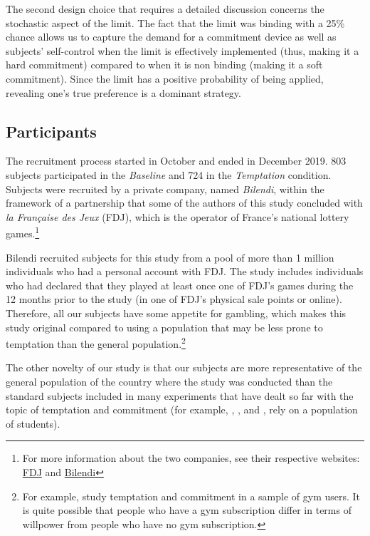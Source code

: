 \documentclass[
]{book}
\begin{document}
The second design choice that requires a detailed discussion concerns the stochastic aspect of the limit.
The fact that the limit was binding with a 25\% chance allows us to capture the demand for a commitment device as well as subjects' self-control when the limit is effectively implemented (thus, making it a hard commitment) compared to when it is non binding (making it a soft commitment).
Since the limit has a positive probability of being applied, revealing one's true preference is a dominant strategy.

\hypertarget{participants}{%
\subsection{Participants}\label{participants}}

The recruitment process started in October and ended in December 2019.
803 subjects participated in the \emph{Baseline} and 724 in the \emph{Temptation} condition.
Subjects were recruited by a private company, named \emph{Bilendi}, within the framework of a partnership that some of the authors of this study concluded with \emph{la Française des Jeux} (FDJ), which is the operator of France's national lottery games.\footnote{For more information about the two companies, see their respective websites: \href{https://www.fdj.fr/}{FDJ} and \href{https://www.bilendi.fr/}{Bilendi}}

Bilendi recruited subjects for this study from a pool of more than 1 million individuals who had a personal account with FDJ.
The study includes individuals who had declared that they played at least once one of FDJ's games during the 12 months prior to the study (in one of FDJ's physical sale points or online).
Therefore, all our subjects have some appetite for gambling, which makes this
study original compared to using a population that may be less prone to
temptation than the general population.\footnote{For example, \citet{milkman2014holding} study temptation and commitment in a sample of gym users.
  It is quite possible that people who have a gym subscription differ in terms of willpower from people who have no gym subscription.}

The other novelty of our study is that our subjects are more representative of the general population of the country where the study was conducted than the standard subjects included in many experiments that have dealt so far with the topic of temptation and commitment (for example, \citet{ariely2002procrastination}, \citet{casari2009pre}, and \citet{houser2018temptation}, rely on a population of students).
\end{document}
